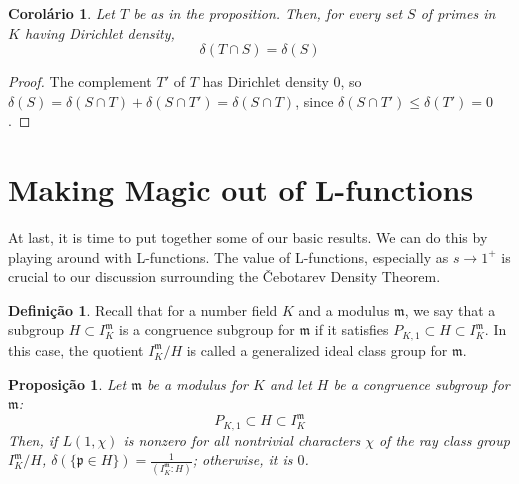 \documentclass{article}
\theoremstyle{plain}
\newtheorem{cor}[thm]{Corolário}
\newtheorem{prop}[thm]{Proposição}
\theoremstyle{definition}
\newtheorem{defn}[thm]{Definição}
\theoremstyle{remark}
\numberwithin{equation}{section}
\numberwithin{thm}{section}
\begin{document}
\begin{cor} \label{5.7}
Let $T$ be as in the proposition. Then, for every set $S$ of primes in $K$ having Dirichlet density, $$\delta(T \cap S) = \delta(S)$$
\end{cor}

\begin{proof}
The complement $T'$ of $T$ has Dirichlet density $0$, so $\delta(S) = \delta(S \cap T) + \delta(S \cap T') = \delta(S \cap T)$, since $\delta(S \cap T') \leq \delta(T') = 0$. 
\end{proof}

\section{Making Magic out of L-functions}

At last, it is time to put together some of our basic results. We can do this by playing around with L-functions. The value of L-functions, especially as $s \to 1^{+}$ is crucial to our discussion surrounding the Čebotarev Density Theorem. 

\begin{defn}
Recall that for a number field $K$ and a modulus $\mathfrak{m}$, we say that a subgroup $H \subset I_{K}^{\mathfrak{m}}$ is a congruence subgroup for $\mathfrak{m}$ if it satisfies $P_{K, 1} \subset H \subset I_{K}^{\mathfrak{m}}$. In this case, the quotient $I_{K}^{\mathfrak{m}}/H$ is called a generalized ideal class group for $\mathfrak{m}$.  
\end{defn}

\begin{prop} \label{6.2}
Let $\mathfrak{m}$ be a modulus for $K$ and let $H$ be a congruence subgroup for $\mathfrak{m}$: $$P_{K, 1} \subset H \subset I_{K}^{\mathfrak{m}}$$ Then, if $L(1, \chi)$ is nonzero for all nontrivial characters $\chi$ of the ray class group $I_{K}^{\mathfrak{m}}/H$, $\delta(\{\mathfrak{p} \in H\}) = \frac{1}{(I_{K}^{\mathfrak{m}} : H)}$; otherwise, it is $0$. 
\end{prop}
\end{document}
